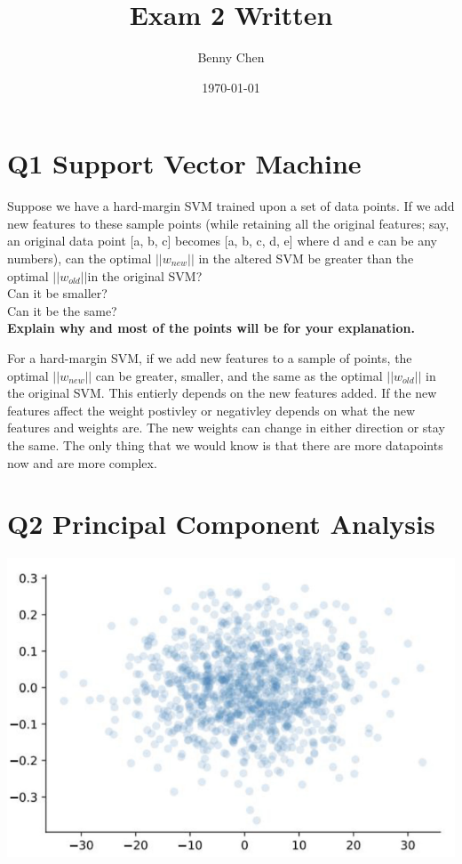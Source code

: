 \documentclass{article}
\title{Exam 2 Written}
\author{Benny Chen}
\date{\today}
\begin{document}
\maketitle

\section*{Q1 Support Vector Machine}
Suppose we have a hard-margin SVM trained upon a set of data points. If we add new features to these sample points (while retaining all the original features; say, an original data point [a, b, c] becomes [a, b, c, d, e] where d and e can be any numbers), can the optimal $|| w_{new} ||$ in the altered SVM be greater than the optimal $||w_{old}||$in the original SVM?
\\
Can it be smaller?
\\
Can it be the same?
\\
\textbf{Explain why and most of the points will be for your explanation.}

For a hard-margin SVM, if we add new features to a sample of points, the optimal $||w_{new}||$ can be greater, smaller, and the same as the optimal $||w_{old}||$ in the original SVM. This entierly depends on the new features added. If the new features affect the weight postivley or negativley depends on what the new features and weights are. The new weights can change in either direction or stay the same. The only thing that we would know is that there are more datapoints now and are more complex.



\section*{Q2 Principal Component Analysis}

\begin{center}
    \includegraphics[scale=0.5]{q2.png}
\end{center}
\end{document}
